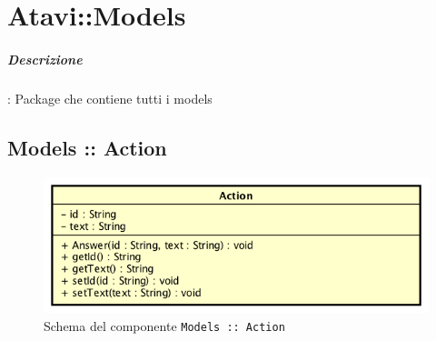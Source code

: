 \documentclass[../ManualeSviluppatore_v2.0.0.tex]{subfiles}
\begin{document}
\section{Atavi::Models}

	\subparagraph{Descrizione}: Package che contiene tutti i models

	      
	\subsection{Models :: Action}
	\begin{figure}[!h]
		\centering
		\includegraphics[scale=0.6]{Architettura/Front-End/Models/Action.png}
		\caption{Schema del componente \texttt{Models :: Action}}
	\end{figure}
\end{document}
